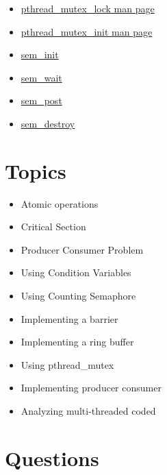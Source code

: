 \begin{itemize}
\item \href{http://linux.die.net/man/3/pthread_mutex_lock}{pthread\_mutex\_lock man page}
\item \href{http://linux.die.net/man/3/pthread_mutex_init}{pthread\_mutex\_init man page}
\item \href{http://man7.org/linux/man-pages/man3/sem_init.3.html}{sem\_init}
\item \href{http://man7.org/linux/man-pages/man3/sem_wait.3.html}{sem\_wait}
\item \href{http://man7.org/linux/man-pages/man3/sem_post.3.html}{sem\_post}
\item \href{http://man7.org/linux/man-pages/man3/sem_destroy.3.html}{sem\_destroy}
\end{itemize}


\section{Topics}

\begin{itemize}
\tightlist
\item
  Atomic operations
\item
  Critical Section
\item
  Producer Consumer Problem
\item
  Using Condition Variables
\item
  Using Counting Semaphore
\item
  Implementing a barrier
\item
  Implementing a ring buffer
\item
  Using pthread\_mutex
\item
  Implementing producer consumer
\item
  Analyzing multi-threaded coded
\end{itemize}

\section{Questions}

